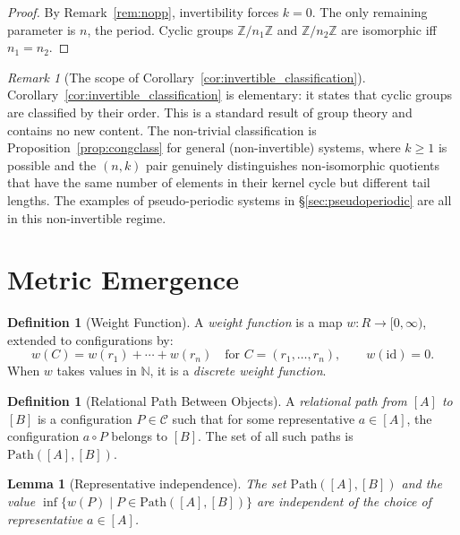 \documentclass{article}
\newtheorem{lemma}[theorem]{Lemma}
\theoremstyle{definition}
\newtheorem{definition}[theorem]{Definition}
\theoremstyle{remark}
\newtheorem{remark}[theorem]{Remark}
\newcommand{\RC}{\mathcal{C}}
\newcommand{\id}{\mathrm{id}}
\begin{document}
\begin{proof}
By Remark~\ref{rem:nopp}, invertibility forces $k = 0$.
The only remaining parameter is $n$, the period. Cyclic groups
$\mathbb{Z}/n_1\mathbb{Z}$ and $\mathbb{Z}/n_2\mathbb{Z}$ are
isomorphic iff $n_1 = n_2$.
\end{proof}

\begin{remark}[The scope of Corollary~\ref{cor:invertible_classification}]
\label{rem:trivialinvertible}
Corollary~\ref{cor:invertible_classification} is elementary: it
states that cyclic groups are classified by their order. This is
a standard result of group theory and contains no new content.
The non-trivial classification is Proposition~\ref{prop:congclass}
for general (non-invertible) systems, where $k \geq 1$ is
possible and the $(n,k)$ pair genuinely distinguishes non-isomorphic
quotients that have the same number of elements in their kernel
cycle but different tail lengths. The examples of pseudo-periodic
systems in \S\ref{sec:pseudoperiodic} are all in this
non-invertible regime.
\end{remark}

\section{Metric Emergence}
\label{sec:metric}

\begin{definition}[Weight Function]
\label{def:weight}
A \emph{weight function} is a map $w : R \to [0,\infty)$,
extended to configurations by:
\[
  w(C) = w(r_1) + \cdots + w(r_n)
  \quad\text{for } C = (r_1, \dots, r_n),
  \qquad w(\id) = 0.
\]
When $w$ takes values in $\mathbb{N}$, it is a
\emph{discrete weight function}.
\end{definition}

\begin{definition}[Relational Path Between Objects]
\label{def:relpath}
A \emph{relational path from $[A]$ to $[B]$} is a configuration
$P \in \RC$ such that for some representative $a \in [A]$, the
configuration $a \circ P$ belongs to $[B]$. The set of all such
paths is $\mathrm{Path}([A],[B])$.
\end{definition}

\begin{lemma}[Representative independence]
\label{lem:repindep}
The set $\mathrm{Path}([A],[B])$ and the value
$\inf\{w(P) \mid P \in \mathrm{Path}([A],[B])\}$
are independent of the choice of representative $a \in [A]$.
\end{lemma}
\end{document}
